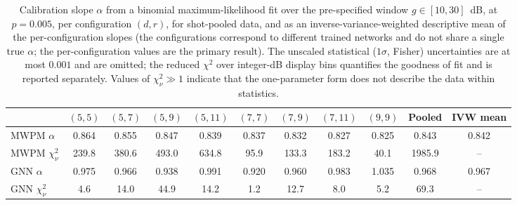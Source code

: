 \begin{table}
\centering
\begin{tabular}{l| c c c c c c c c |c|c}
\toprule
 & $(5, 5)$ & $(5, 7)$ & $(5, 9)$ & $(5, 11)$ & $(7, 7)$ & $(7, 9)$ & $(7, 11)$ & $(9, 9)$ & Pooled & IVW mean \\
\hline
\midrule
MWPM $\alpha$ & 0.864 & 0.855 & 0.847 & 0.839 & 0.837 & 0.832 & 0.827 & 0.825 & 0.843 & 0.842 \\
MWPM $\chi^2_\nu$ & 239.8 & 380.6 & 493.0 & 634.8 & 95.9 & 133.3 & 183.2 & 40.1 & 1985.9 & -- \\
\hline
GNN $\alpha$ & 0.975 & 0.966 & 0.938 & 0.991 & 0.920 & 0.960 & 0.983 & 1.035 & 0.968 & 0.967 \\
GNN $\chi^2_\nu$ & 4.6 & 14.0 & 44.9 & 14.2 & 1.2 & 12.7 & 8.0 & 5.2 & 69.3 & -- \\
\bottomrule
\end{tabular}
\caption{Calibration slope $\alpha$ from a binomial maximum-likelihood fit over the pre-specified window $g \in [10, 30]$~dB, at $p = 0.005$, per configuration $(d, r)$, for shot-pooled data, and as an inverse-variance-weighted descriptive mean of the per-configuration slopes (the configurations correspond to different trained networks and do not share a single true $\alpha$; the per-configuration values are the primary result). The unscaled statistical ($1\sigma$, Fisher) uncertainties are at most $0.001$ and are omitted; the reduced $\chi^2$ over integer-dB display bins quantifies the goodness of fit and is reported separately. Values of $\chi^2_\nu \gg 1$ indicate that the one-parameter form does not describe the data within statistics.}
\label{alpha_table}
\end{table}
